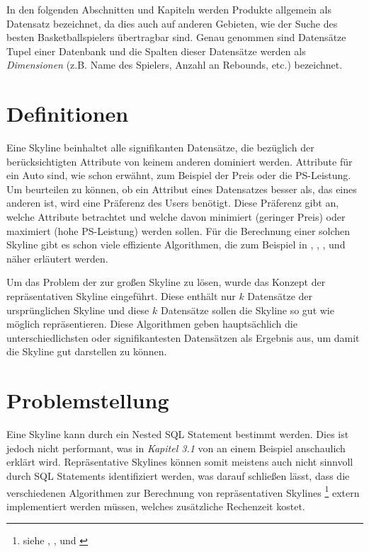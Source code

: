 In den folgenden Abschnitten und Kapiteln werden Produkte allgemein als Datensatz bezeichnet, da dies auch auf anderen Gebieten, wie der Suche des besten Basketballspielers übertragbar sind.
Genau genommen sind Datensätze Tupel einer Datenbank und die Spalten dieser Datensätze werden als \textit{Dimensionen} (z.B. Name des Spielers, Anzahl an Rebounds, etc.) bezeichnet.
\section{Definitionen}
\label{ch:Einleitung:sec:Definitionen}
Eine Skyline beinhaltet alle signifikanten Datensätze, die bezüglich der berücksichtigten Attribute von keinem anderen dominiert werden. Attribute für ein Auto sind, wie schon erwähnt, zum Beispiel der Preis oder die PS-Leistung. Um beurteilen zu können, ob ein Attribut eines Datensatzes besser als, das eines anderen ist, wird eine Präferenz des Users benötigt. Diese Präferenz gibt an, welche Attribute betrachtet und welche davon minimiert (geringer Preis) oder maximiert (hohe PS-Leistung) werden sollen. Für die Berechnung einer solchen Skyline gibt es schon viele effiziente Algorithmen, die zum Beispiel in \cite{borzsony2001skyline}, \cite{Chan:2006:HDS:2117976.2118017}, \cite{Kossmann:2002:SSS:1287369.1287394}, \cite{Papadias:2003:OPA:872757.872814} und \cite{Tan:2001:EPS:645927.672217} näher erläutert werden.

Um das Problem der zur großen Skyline zu lösen, wurde das Konzept der repräsentativen Skyline eingeführt. Diese enthält nur $k$ Datensätze der ursprünglichen Skyline und diese $k$ Datensätze sollen die Skyline so gut wie möglich repräsentieren. Diese Algorithmen geben hauptsächlich die unterschiedlichsten oder signifikantesten Datensätzen als Ergebnis aus, um damit die Skyline gut darstellen zu können. 
\section{Problemstellung}
\label{ch:Einleitung:sec:Problemstellung}
Eine Skyline kann durch ein Nested SQL Statement bestimmt werden. Dies ist jedoch nicht performant, was in \textit{Kapitel 3.1} von \cite{borzsony2001skyline} an einem Beispiel anschaulich erklärt wird. Repräsentative Skylines können somit meistens auch nicht sinnvoll durch SQL Statements identifiziert werden, was darauf schließen lässt, dass die verschiedenen Algorithmen zur Berechnung von repräsentativen Skylines \footnote{siehe \cite{Tao:2009:DRS:1546683.1547325}, \cite{cai2015efficient}, \cite{magnani2014taking} und \cite{4221657}} extern implementiert werden müssen, welches zusätzliche Rechenzeit kostet.

